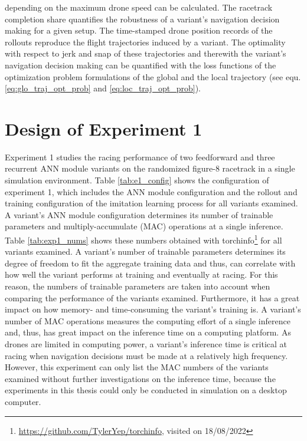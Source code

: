 depending on the maximum drone speed
can be calculated.
The racetrack completion share quantifies
the robustness of a variant's navigation decision making 
for a given setup.
The time-stamped drone position records of the rollouts
reproduce the flight trajectories induced by a variant.
The optimality with respect to jerk and snap
of these trajectories and therewith the 
variant's navigation decision making 
can be quantified
with the loss functions of the optimization problem formulations
of the global and the local trajectory
(see equ. \ref{eq:glo_traj_opt_prob} and \ref{eq:loc_traj_opt_prob}).









\section{Design of Experiment 1}
Experiment 1 studies the
racing performance of 
two feedforward and three recurrent ANN module variants 
on the randomized figure-8 racetrack 
in a single simulation environment.
Table \ref{tab:e1_config} shows the
configuration of experiment 1,
which includes the ANN module configuration
and the rollout and training configuration 
of the imitation learning process
for all variants examined.
A variant's ANN module configuration
determines its number of trainable parameters and 
multiply-accumulate (MAC) operations at a single inference.
Table \ref{tab:exp1_nums} shows these
numbers
obtained with 
torchinfo\footnote{\url{https://github.com/TylerYep/torchinfo}, visited on 18/08/2022}
for all variants examined.
A variant's number of trainable parameters
determines its degree of freedom to fit the aggregate training data
and thus,
can correlate with 
how well the variant performs at training
and eventually at racing.
For this reason, the numbers of trainable parameters 
are taken into account
when comparing the performance of the variants examined.
Furthermore, it has a great impact on
how memory- and time-consuming the variant's training is.
A variant's number of MAC operations 
measures the computing effort of a single inference
and, thus, has great impact on the inference time
on a computing platform.
As drones are limited in computing power,
a variant's inference time 
is critical at racing when 
navigation decisions
must be made at a relatively high frequency.
However, this experiment
can only list the MAC numbers of the variants examined
without further investigations on the inference time,
because the experiments in this thesis
could only be conducted in simulation on a desktop computer.


